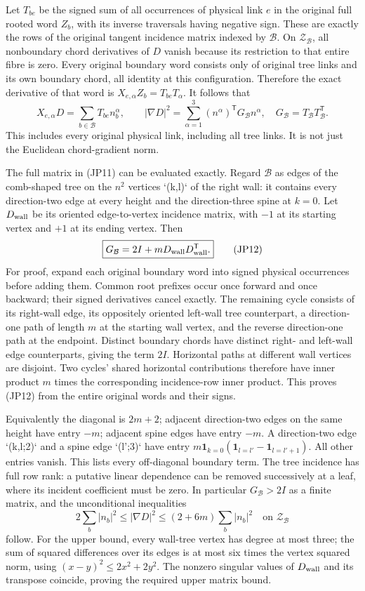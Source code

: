 \documentclass[11pt]{article}
\begin{document}
Let \(T_{be}\) be the signed sum of all occurrences of physical link
\(e\) in the original full rooted word \(Z_b\), with its inverse
traversals having negative sign. These are exactly the rows of the
original tangent incidence matrix indexed by \(\mathcal B\).
On \(\mathcal Z_{\mathcal B}\), all nonboundary chord derivatives of
\(D\) vanish because its restriction to that entire fibre is zero.
Every original boundary word consists only of original tree links and
its own boundary chord, all identity at this configuration. Therefore
the exact derivative of that word is
\(X_{e,\alpha}Z_b=T_{be}T_\alpha\). It follows that
\[
 X_{e,\alpha}D=\sum_{b\in\mathcal B}T_{be}n_b^\alpha,\qquad
 |\nabla D|^2=\sum_{\alpha=1}^3
   (n^\alpha)^{\mathsf T}G_{\mathcal B}n^\alpha,
 \quad G_{\mathcal B}=T_{\mathcal B}T_{\mathcal B}^{\mathsf T}.
\tag{JP11}
\]
This includes every original physical link, including all tree links.
It is not just the Euclidean chord-gradient norm.

The full matrix in (JP11) can be evaluated exactly. Regard \(\mathcal B\)
as edges of the comb-shaped tree on the \(n^2\) vertices `(k,l)` of the
right wall: it contains every direction-two edge at every height and
the direction-three spine at \(k=0\). Let \(D_{\rm wall}\) be its
oriented edge-to-vertex incidence matrix, with \(-1\) at its starting
vertex and \(+1\) at its ending vertex. Then
\[
\boxed{G_{\mathcal B}=2I+mD_{\rm wall}D_{\rm wall}^{\mathsf T}.}
\tag{JP12}
\]
For proof, expand each original boundary word into signed physical
occurrences before adding them. Common root prefixes occur once forward
and once backward; their signed derivatives cancel exactly. The remaining
cycle consists of its right-wall edge, its oppositely oriented left-wall
tree counterpart, a direction-one path of length \(m\) at the starting
wall vertex, and the reverse direction-one path at the endpoint. Distinct
boundary chords have distinct right- and left-wall edge counterparts,
giving the term \(2I\). Horizontal paths at different wall vertices are
disjoint. Two cycles' shared horizontal contributions therefore have
inner product \(m\) times the corresponding incidence-row inner product.
This proves (JP12) from the entire original words and their signs.

Equivalently the diagonal is \(2m+2\); adjacent direction-two edges
on the same height have entry \(-m\); adjacent spine edges have entry
\(-m\). A direction-two edge `(k,l;2)` and a spine edge `(l';3)` have
entry \(m\mathbf1_{k=0}(\mathbf1_{l=l'}-\mathbf1_{l=l'+1})\).
All other entries vanish. This lists every off-diagonal boundary term.
The tree incidence has full row rank: a putative linear dependence can
be removed successively at a leaf, where its incident coefficient must
be zero. In particular \(G_{\mathcal B}>2I\) as a finite matrix, and
the unconditional inequalities
\[
 2\sum_b|n_b|^2\le |\nabla D|^2
          \le(2+6m)\sum_b|n_b|^2
 \quad\text{on }\mathcal Z_{\mathcal B}
 \tag{JP13}
\]
follow. For the upper bound, every wall-tree vertex has degree at most
three; the sum of squared differences over its edges is at most six
times the vertex squared norm, using \((x-y)^2\le2x^2+2y^2\).
The nonzero singular values of \(D_{\rm wall}\) and its transpose
coincide, proving the required upper matrix bound.
\end{document}
